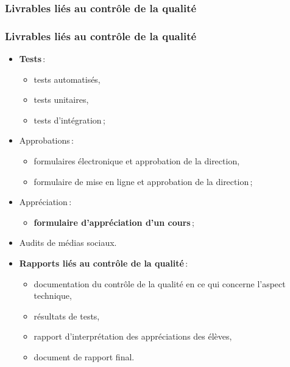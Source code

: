 					\subsubsection{Livrables liés au contrôle de la qualité} 
							\begin{frame}[allowframebreaks]
							\frametitle{Livrables liés au contrôle de la qualité}
                        			
							\begin{itemize}
							
							\item \textbf{Tests}\,: 
								\begin{itemize}
								\item tests automatisés,
								\item tests unitaires,
								\item tests d’intégration\,;
								\end{itemize}
							\item Approbations\,:
								\begin{itemize}
								\item formulaires électronique et approbation de la direction,
								\item formulaire de mise en ligne et approbation de la direction\,;
								\end{itemize}
							\item Appréciation\,: 
								\begin{itemize}
								\item \textbf{formulaire d’appréciation d’un cours}\,;
								\end{itemize}
							\framebreak
							\item Audits de médias sociaux.
							\item \textbf{Rapports liés au contrôle de la qualité}\,:
								\begin{itemize}
								\item documentation du contrôle de la qualité en ce qui concerne l’aspect technique,
								\item résultats de tests,
								\item rapport d’interprétation des appréciations des élèves,
								\item document de rapport final.
								
								
								\end{itemize}
							\end{itemize}						
					\end{frame}

